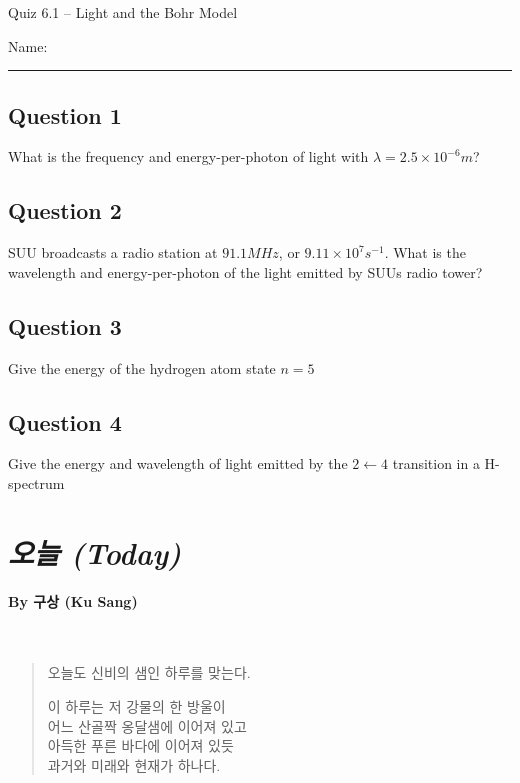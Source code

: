 \documentclass[11pt, letterpaper]{memoir}
\begin{document}
	\begin{center}
		{\large	Quiz 6.1 -- Light and the Bohr Model}
	\end{center}
{\large Name: \rule[-1mm]{4in}{.1pt}

	\subsection*{Question 1}
  What is the frequency and energy-per-photon of light with $\lambda=2.5\times10^{-6}m$?

  \vspace{6em}
	\subsection*{Question 2}
  SUU broadcasts a radio station at $91.1MHz$, or $9.11\times10^7s^{-1}$. What is the wavelength and energy-per-photon of the light emitted by SUUs radio tower?

  \vspace{6em}
	\subsection*{Question 3}
  Give the energy of the hydrogen atom state $n=5$

  \vspace{6em}
	\subsection*{Question 4}
	Give the energy and wavelength of light emitted by the $2\leftarrow4$ transition in a H-spectrum
	
\newpage
\pagestyle{empty}
\addtocounter{page}{-1}
\section*{\emph{{오늘} (Today)}}
\paragraph{By {구상} (Ku Sang)}~

{
\begin{verse}
	오늘도 신비의 샘인 하루를 맞는다.

	이 하루는 저 강물의 한 방울이\\
	어느 산골짝 옹달샘에 이어져 있고\\
	아득한 푸른 바다에 이어져 있듯\\
	과거와 미래와 현재가 하나다.


\end{verse}}}
\end{document}
